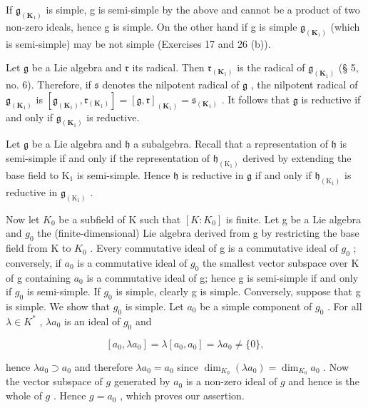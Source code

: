 If \(\mathfrak{g}_{(\mathbf{K}_{1})}\) is simple, g is semi-simple by the above and cannot be a product of two non-zero ideals, hence g is simple. On the other hand if g is simple \(\mathfrak{g}_{(\mathbf{K}_{1})}\) (which is semi-simple) may be not simple (Exercises 17 and 26 (b)).

Let \(\mathfrak{g}\) be a Lie algebra and \(\mathfrak{r}\) its radical. Then \(\mathfrak{r}_{(\mathbf{K}_1)}\) is the radical of \(\mathfrak{g}_{(\mathbf{K}_1)}\) (§ 5, no. 6). Therefore, if \(\mathfrak{s}\) denotes the nilpotent radical of \(\mathfrak{g}\) , the nilpotent radical of \(\mathfrak{g}_{(\mathbf{K}_1)}\) is \([\mathfrak{g}_{(\mathbf{K}_1)},\mathfrak{r}_{(\mathbf{K}_1)}] = [\mathfrak{g},\mathfrak{r}]_{(\mathbf{K}_1)} = \mathfrak{s}_{(\mathbf{K}_1)}\) . It follows that \(\mathfrak{g}\) is reductive if and only if \(\mathfrak{g}_{(\mathbf{K}_1)}\) is reductive.

Let \(\mathfrak{g}\) be a Lie algebra and \(\mathfrak{h}\) a subalgebra. Recall that a representation of \(\mathfrak{h}\) is semi-simple if and only if the representation of \(\mathfrak{h}_{(\mathrm{K}_1)}\) derived by extending the base field to \(\mathrm{K}_1\) is semi-simple. Hence \(\mathfrak{h}\) is reductive in \(\mathfrak{g}\) if and only if \(\mathfrak{h}_{(\mathrm{K}_1)}\) is reductive in \(\mathfrak{g}_{(\mathrm{K}_1)}\) .

Now let \(K_{0}\) be a subfield of K such that \([K:K_{0}]\) is finite. Let g be a Lie algebra and \(g_{0}\) the (finite-dimensional) Lie algebra derived from g by restricting the base field from K to \(K_{0}\) . Every commutative ideal of g is a commutative ideal of \(g_{0}\) ; conversely, if \(a_{0}\) is a commutative ideal of \(g_{0}\) the smallest vector subspace over K of g containing \(a_{0}\) is a commutative ideal of g; hence g is semi-simple if and only if \(g_{0}\) is semi-simple. If \(g_{0}\) is simple, clearly g is simple. Conversely, suppose that g is simple. We show that \(g_{0}\) is simple. Let \(a_{0}\) be a simple component of \(g_{0}\) . For all \(\lambda \in K^{*}\) , \(\lambda a_{0}\) is an ideal of \(g_{0}\) and

\[
\left[ a _ {0}, \lambda a _ {0} \right] = \lambda \left[ a _ {0}, a _ {0} \right] = \lambda a _ {0} \neq \{0 \},
\]

hence \(\lambda a_0 \supset a_0\) and therefore \(\lambda a_0 = a_0\) since \(\dim_{K_0}(\lambda a_0) = \dim_{K_0}a_0\) . Now the vector subspace of \(g\) generated by \(a_0\) is a non-zero ideal of \(g\) and hence is the whole of \(g\) . Hence \(g = a_0\) , which proves our assertion.

